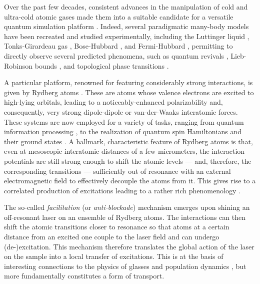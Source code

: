 \documentclass[prl,aps,twocolumn,showpacs,superscriptaddress,longbibliography]{revtex4-1}
\begin{document}
Over the past few decades, consistent advances in the manipulation of cold and ultra-cold atomic gases made them into a suitable candidate for a versatile quantum simulation platform \cite{Bloch_2008,Bloch_2012}. Indeed, several paradigmatic many-body models have been recreated and studied experimentally, including the Luttinger liquid \cite{hofferberth2007}, Tonks-Girardeau gas \cite{kinoshita2004}, Bose-Hubbard \cite{greiner2002, greiner2003}, and Fermi-Hubbard \cite{Kohl2005}, permitting to directly observe several predicted phenomena, such as quantum revivals \cite{greiner2002_revival}, Lieb-Robinson bounds \cite{cheneau2012}, and topological phase transitions \cite{hadzibabic2006}.

A particular platform, renowned for featuring considerably strong interactions, is given by Rydberg atoms \cite{a_Saffman_RMP_10, Low_2012, Gallagher_1994}. These are atoms whose valence electrons are excited to high-lying orbitals, leading to a noticeably-enhanced polarizability and, consequently, very strong dipole-dipole or van-der-Waaks interatomic forces. These systems are now employed for a variety of tasks, ranging from quantum information processing \cite{Jaksch2000,Weimer_2010,Saffman_2016}, to the realization of quantum spin Hamiltonians \cite{Labuhn_2015} and their ground states \cite{Schauss_2015}. A hallmark, characteristic feature of Rydberg atoms is that, even at mesoscopic interatomic distances of a few micrometers, the interaction potentials are still strong enough to shift the atomic levels --- and, therefore, the corresponding transitions --- sufficiently out of resonance with an external electromagnetic field to effectively decouple the atoms from it. This gives rise to a correlated production of excitations leading to a rather rich phenomenology \cite{Weimer2010, Lan2016, Levi2016, Lan2015, Schempp2014, Schauss_2015, Low2009, Sibalic2016, Carr2013, Marcuzzi2014, Gutierrez2015}.


The so-called \emph{facilitation} (or \emph{anti-blockade}) mechanism \cite{Ates_2007,Amthor_2010,Garttner_2013,schonleber2014,Lesanovsky_2014,Urvoy_2015,Valado_2016} emerges upon shining an off-resonant laser on an ensemble of Rydberg atoms. The interactions can then shift the atomic transitions closer to resonance so that atoms at a certain distance from an excited one couple to the laser field and can undergo (de-)excitation. This mechanism therefore translates the global action of the laser on the sample into a local transfer of excitations. This is at the basis of interesting connections to the physics of glasses \cite{Lesanovsky2013} and population dynamics \cite{CPE2017,Marcuzzi2016,Buchhold2017}, but more fundamentally constitutes a form of transport.
\end{document}
